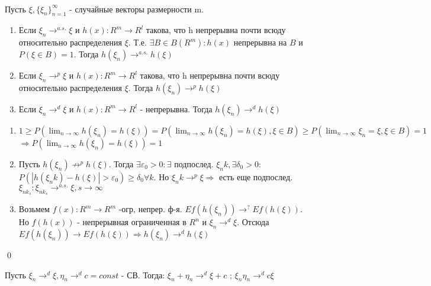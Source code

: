 \documentclass{article}
\begin{document}
	\begin{theorem}[<о наследовании сх-ти>]\\
	Пусть $\xi, \{\xi_n\}_{n=1}^\infty$ - случайные векторы размерности m.
	\begin{enumerate}
		\item Если $\xi_n \to^{a.s.} \xi$ и $h(x):R^m \to R^l$ такова, что h непрерывна почти всюду относительно распределения $\xi$.
		Т.е. $\exists B \in B(R^m): h(x)$ непрерывна на $B$ и $P(\xi \in B) = 1$. Тогда $h(\xi_n) \to^{a.s.} h(\xi)$
		\item Если $\xi_n \to^{p} \xi$ и $h(x):R^m \to R^l$ такова, что h непрерывна почти всюду относительно распределения $\xi$. 
		Тогда $h(\xi_n) \to^{p} h(\xi)$
		\item Если $\xi_n \to^{d} \xi$ и $h(x):R^m \to R^l$ - непрерывна. Тогда $h(\xi_n) \to^{d} h(\xi)$
	\end{enumerate}
	\proof
	\begin{enumerate}
		\item $1 \ge P(\lim_{n\to\infty}h(\xi_n)=h(\xi)) = P(\lim_{n\to\infty}h(\xi_n)=h(\xi), \xi \in B) \ge P(\lim_{n\to\infty}\xi_n=\xi, \xi \in B) = 1$
		$\Rightarrow P(\lim_{n\to\infty}h(\xi_n)=h(\xi)) = 1$
		\item Пусть $h(\xi_n) \not\to^p h(\xi)$. Тогда $\exists \varepsilon_0 > 0: \exists$ подпослед. $\xi_nk, \exists \delta_0  > 0:$
		$P(|h(\xi_nk) - h(\xi)| > \varepsilon_0) \ge \delta_0 \forall k$.
		Но $\xi_nk \to^p \xi \Rightarrow$ есть еще подпослед. $\xi_{nk_s}: \xi_{nk_s} \to^{a.s.} \xi, s \to \infty$
		\item Возьмем $f(x):R^m \to R^m$ -огр, непрер. ф-я. $Ef(h(\xi_n))\to^? Ef(h(\xi)) $.
		Но $f(h(x))$ - непрерывная ограниченная в $R^n$ и $\xi_n\to^d\xi$. Отсюда $Ef(h(\xi_n)) \to Ef(h(\xi)) \Rightarrow h(\xi_n) \to^d h(\xi)$
	\end{enumerate}
	\qed
	\end{theorem}
	
	\begin{lemma}[<Слуцкого>]
		Пусть $\xi_n \to^d \xi, \eta_n \to^d c = const$ - СВ. Тогда: $\xi_n + \eta_n \to^d \xi + c$ ; $\xi_n\eta_n \to^d c\xi $
	\end{lemma}
	
	
\end{document}
